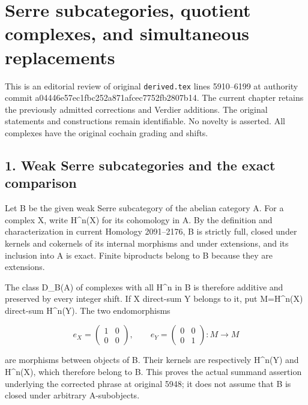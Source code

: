 \section{\texorpdfstring{Serre subcategories,\allowbreak{} quotient complexes,\allowbreak{} and simultaneous replacements}{Serre  quotient  and simultaneous replacements}}\label{proofs-5910-6199-serre-subcategories-quotient-complexes-and-simultaneous-replacements}

This is an editorial review of original \texttt{derived.\allowbreak{}tex} lines 5910–\allowbreak{}6199 at authority commit a04446e5\allowbreak{}7ec1fbc2\allowbreak{}52a871af\allowbreak{}cec7752f\allowbreak{}b2807b14. The current chapter retains the previously admitted corrections and Verdier additions. The original statements and constructions remain identifiable. No novelty is asserted. All complexes have the original cochain grading and shifts.

\subsection{1. Weak Serre subcategories and the exact comparison}\label{proofs-5910-6199-weak-serre-subcategories-and-the-exact-comparison}

Let B be the given weak Serre subcategory of the abelian category A. For a complex X,\allowbreak{} write H\textasciicircum{}n(X)\allowbreak{} for its cohomology in A. By the definition and characterization in current Homology 2091–\allowbreak{}2176,\allowbreak{} B is strictly full,\allowbreak{} closed under kernels and cokernels of its internal morphisms and under extensions,\allowbreak{} and its inclusion into A is exact. Finite biproducts belong to B because they are extensions.

The class D\_\allowbreak{}B(A)\allowbreak{} of complexes with all H\^{}n in B is therefore additive and preserved by every integer shift. If X direct-sum Y belongs to it,\allowbreak{} put M\allowbreak{}=H\textasciicircum{}n(X)\allowbreak{} direct-sum H\textasciicircum{}n(Y)\allowbreak{}. The two endomorphisms

\[
 e_X=\begin{pmatrix}1&0\\0&0\end{pmatrix},\qquad
 e_Y=\begin{pmatrix}0&0\\0&1\end{pmatrix}:M\longrightarrow M
\]

are morphisms between objects of B. Their kernels are respectively H\textasciicircum{}n(Y)\allowbreak{} and H\textasciicircum{}n(X)\allowbreak{},\allowbreak{} which therefore belong to B. This proves the actual summand assertion underlying the corrected phrase at original 5948; it does not assume that B is closed under arbitrary A-subobjects.

